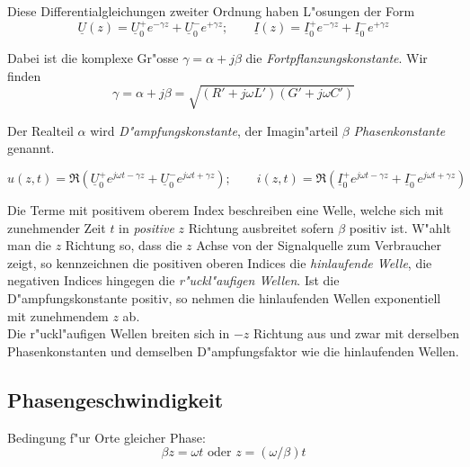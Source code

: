\documentclass[german, 10pt, a4paper, headsepline]{scrreprt}
\theoremstyle{remark}
\begin{document}
Diese Differentialgleichungen zweiter Ordnung haben L"osungen der Form
\begin{displaymath}
	\underline{U}(z) = \underline{U}^+_0 e^{-\gamma z} + \underline{U}^-_0 e^{+\gamma z}; \qquad \underline{I}(z) = \underline{I}^+_0 e^{-\gamma z} + \underline{I}^-_0 e^{+\gamma z}
\end{displaymath}

Dabei ist die komplexe Gr"osse $\gamma = \alpha + j \beta$ die \textit{Fortpflanzungskonstante}. Wir finden
\begin{displaymath}
	\gamma = \alpha + j \beta = \sqrt{(R'+j\omega L')(G'+j\omega C')}
\end{displaymath}

Der Realteil $\alpha$ wird \textit{D"ampfungskonstante}, der Imagin"arteil $\beta$ \textit{Phasenkonstante} genannt.

\begin{displaymath}
	u(z,t) = \Re(\underline{U}^+_0e^{j\omega t -\gamma z}+\underline{U}^-_0 e^{j\omega t + \gamma z}); \qquad i(z,t) = \Re(\underline{I}^+_0e^{j\omega t -\gamma z}+\underline{I}^-_0 e^{j\omega t + \gamma z})
\end{displaymath}

Die Terme mit positivem oberem Index beschreiben eine Welle, welche sich mit zunehmender Zeit $t$ in \textit{positive} $z$ Richtung ausbreitet sofern $\beta$ positiv ist. W"ahlt man die $z$ Richtung so, dass die $z$ Achse von der Signalquelle zum Verbraucher zeigt, so kennzeichnen die positiven oberen Indices die \textit{hinlaufende Welle}, die negativen Indices hingegen die \textit{r"uckl"aufigen Wellen}. Ist die D"ampfungskonstante positiv, so nehmen die hinlaufenden Wellen exponentiell mit zunehmendem $z$ ab.\\
Die r"uckl"aufigen Wellen breiten sich in $-z$ Richtung aus und zwar mit derselben Phasenkonstanten und demselben D"ampfungsfaktor wie die hinlaufenden Wellen.

\subsection{Phasengeschwindigkeit}

Bedingung f"ur Orte gleicher Phase:
\begin{displaymath}
	\beta z = \omega t \mbox{ oder } z = (\omega / \beta) t
\end{displaymath}
\end{document}
